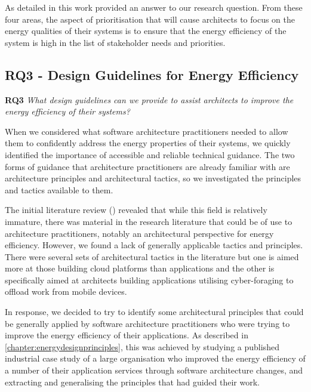 As detailed in  this work provided an answer to our research question.  From these four areas, the aspect of prioritisation that will cause architects to focus on the energy qualities of their systems is to ensure that the energy efficiency of the system is high in the list of stakeholder needs and priorities.

\subsection{RQ3 - Design Guidelines for Energy Efficiency}

\textbf{RQ3} \emph{What design guidelines can we provide to assist architects to improve the energy efficiency of their systems?}

When we considered what software architecture practitioners needed to allow them to confidently address the energy properties of their systems, we quickly identified the importance of accessible and reliable technical guidance.  The two forms of guidance that architecture practitioners are already familiar with are architecture principles and architectural tactics, so we investigated the principles and tactics available to them.

The initial literature review () revealed that while this field is relatively immature, there was material in the research literature that could be of use to architecture practitioners, notably an architectural perspective for energy efficiency. However, we found a lack of generally applicable tactics and principles.  There were several sets of architectural tactics in the literature \cite{lewis2015-foragingtactics,procaccianti2013-cloudenergyefficiency} but one is aimed more at those building cloud platforms than applications and the other is specifically aimed at architects building applications utilising cyber-foraging to offload work from mobile devices.

In response, we decided to try to identify some architectural principles that could be generally applied by software architecture practitioners who were trying to improve the energy efficiency of their applications.  As described in \cref{chapter:energydesignprinciples}, this was achieved by studying a published industrial case study of a large organisation who improved the energy efficiency of a number of their application services through software architecture changes, and extracting and generalising the principles that had guided their work.

